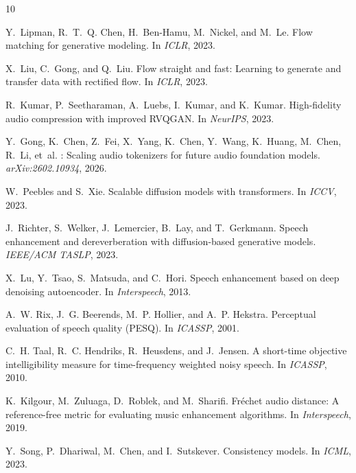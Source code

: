 \documentclass[10pt,twocolumn,letterpaper]{article}
\begin{document}
{\small

\begin{thebibliography}{10}

Y.~Lipman, R.~T.~Q. Chen, H.~Ben-Hamu, M.~Nickel, and M.~Le.
\newblock Flow matching for generative modeling.
\newblock In \emph{ICLR}, 2023.

X.~Liu, C.~Gong, and Q.~Liu.
\newblock Flow straight and fast: Learning to generate and transfer data with rectified flow.
\newblock In \emph{ICLR}, 2023.

R.~Kumar, P.~Seetharaman, A.~Luebs, I.~Kumar, and K.~Kumar.
\newblock High-fidelity audio compression with improved {RVQGAN}.
\newblock In \emph{NeurIPS}, 2023.

Y.~Gong, K.~Chen, Z.~Fei, X.~Yang, K.~Chen, Y.~Wang, K.~Huang, M.~Chen, R.~Li, et~al.
: Scaling audio tokenizers for future audio foundation models.
\newblock \emph{arXiv:2602.10934}, 2026.

W.~Peebles and S.~Xie.
\newblock Scalable diffusion models with transformers.
\newblock In \emph{ICCV}, 2023.

J.~Richter, S.~Welker, J.~Lemercier, B.~Lay, and T.~Gerkmann.
\newblock Speech enhancement and dereverberation with diffusion-based generative models.
\newblock \emph{IEEE/ACM TASLP}, 2023.

X.~Lu, Y.~Tsao, S.~Matsuda, and C.~Hori.
\newblock Speech enhancement based on deep denoising autoencoder.
\newblock In \emph{Interspeech}, 2013.

A.~W. Rix, J.~G. Beerends, M.~P. Hollier, and A.~P. Hekstra.
\newblock Perceptual evaluation of speech quality ({PESQ}).
\newblock In \emph{ICASSP}, 2001.

C.~H. Taal, R.~C. Hendriks, R.~Heusdens, and J.~Jensen.
\newblock A short-time objective intelligibility measure for time-frequency weighted noisy speech.
\newblock In \emph{ICASSP}, 2010.

K.~Kilgour, M.~Zuluaga, D.~Roblek, and M.~Sharifi.
\newblock Fr\'echet audio distance: A reference-free metric for evaluating music enhancement algorithms.
\newblock In \emph{Interspeech}, 2019.

Y.~Song, P.~Dhariwal, M.~Chen, and I.~Sutskever.
\newblock Consistency models.
\newblock In \emph{ICML}, 2023.

\end{thebibliography}
}
\end{document}
